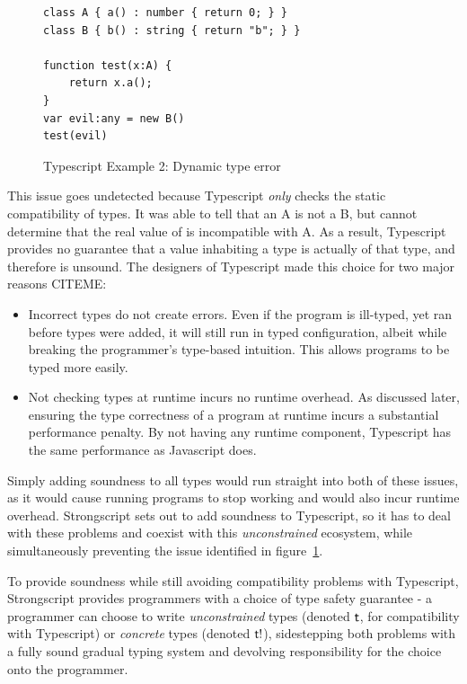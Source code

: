 \documentclass[preprint]{sigplanconf}
\renewcommand{\t}{\M{\xt{t}}}
\newcommand{\M}[1]{\ensuremath{#1}\xspace}
\newcommand{\xt}[1]{{\sf{#1}}\xspace}
\begin{document}
\begin{figure}[h]
\begin{verbatim}
class A { a() : number { return 0; } }
class B { b() : string { return "b"; } }

function test(x:A) {
	return x.a();
}
var evil:any = new B()
test(evil)
\end{verbatim}
\caption{Typescript Example 2: Dynamic type error}
\label{fig:tsex2}
\end{figure}

This issue goes undetected because Typescript \emph{only} checks the static
compatibility of types. It was able to tell that an A is not a B, but cannot
determine that the real value of \xt{evil} is incompatible with A. As a result,
Typescript provides no guarantee that a value inhabiting a type is actually of
that type, and therefore is unsound. The designers of Typescript made this choice
for two major reasons CITEME:

\begin{itemize}
\item Incorrect types do not create errors. Even if the program is ill-typed,
yet ran before types were added, it will still run in typed configuration, 
albeit while breaking the programmer's type-based intuition. This allows programs
to be typed more easily.
\item Not checking types at runtime incurs no runtime overhead. As discussed later,
ensuring the type correctness of a program at runtime incurs a substantial performance
penalty. By not having any runtime component, Typescript has the same performance
as Javascript does.
\end{itemize}

Simply adding soundness to all types would run straight into both of these
issues, as it would cause running programs to stop working and would 
also incur runtime overhead. Strongscript sets out to add soundness to
Typescript, so it has to deal with these problems and coexist with this
\emph{unconstrained} ecosystem, while simultaneously preventing the issue
identified in figure~\ref{fig:tsex2}.

To provide soundness while still avoiding compatibility problems with 
Typescript, Strongscript provides programmers with a choice of type
safety guarantee - a programmer can choose to write \emph{unconstrained}
types (denoted $\t$, for compatibility with Typescript) or \emph{concrete}
types (denoted $\t\xt{!}$), sidestepping both problems with a fully sound
gradual typing system and devolving responsibility for the choice onto
the programmer.
\end{document}
